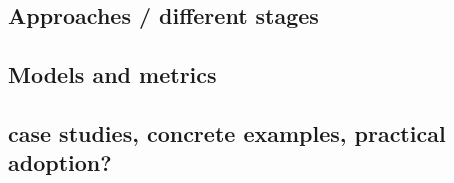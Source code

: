 
\subsection{Approaches / different stages} %

\subsection{Models and metrics} %


\subsection{case studies, concrete examples, practical adoption?}

